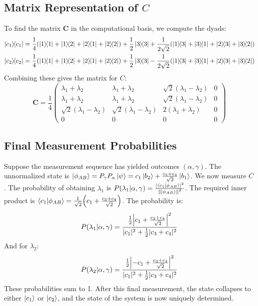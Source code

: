 \documentclass[11pt,a4paper]{article}
\begin{document}
\subsection{Matrix Representation of \texorpdfstring{$C$}{C}}
To find the matrix $\mathbf{C}$ in the computational basis, we compute the dyads:
\begin{align*}
  \dyad{c_1}{c_1} &=
  \frac{1}{4}\qty(\dyad{1}{1}+\dyad{1}{2}+\dyad{2}{1}+\dyad{2}{2}) +
  \frac{1}{2}\dyad{3}{3} +
  \frac{1}{2\sqrt{2}}\qty(\dyad{1}{3}+\dyad{3}{1}+\dyad{2}{3}+\dyad{3}{2}) \\
  \dyad{c_2}{c_2} &=
  \frac{1}{4}\qty(\dyad{1}{1}+\dyad{1}{2}+\dyad{2}{1}+\dyad{2}{2}) +
  \frac{1}{2}\dyad{3}{3} -
  \frac{1}{2\sqrt{2}}\qty(\dyad{1}{3}+\dyad{3}{1}+\dyad{2}{3}+\dyad{3}{2})
\end{align*}
Combining these gives the matrix for $C$:
$$
\mathbf{C} = \frac{1}{4}
\begin{pmatrix}
  \lambda_1+\lambda_2 & \lambda_1+\lambda_2 & \sqrt{2}(\lambda_1-\lambda_2) & 0
  \\
  \lambda_1+\lambda_2 & \lambda_1+\lambda_2 & \sqrt{2}(\lambda_1-\lambda_2) & 0
  \\
  \sqrt{2}(\lambda_1-\lambda_2) & \sqrt{2}(\lambda_1-\lambda_2) &
  2(\lambda_1+\lambda_2) & 0 \\
  0 & 0 & 0 & 0
\end{pmatrix}
$$

\subsection{Final Measurement Probabilities}
Suppose the measurement sequence has yielded outcomes $(\alpha, \gamma)$. The
unnormalized state is $\ket{\phi_{AB}} = P_\gamma P_\alpha \ket{\psi} =
c_1\ket{b_2} + \frac{c_3+c_4}{\sqrt{2}}\ket{b_1}$.
We now measure $C$. The probability of obtaining $\lambda_1$ is
$P(\lambda_1|\alpha, \gamma) =
\frac{|\braket{c_1}{\phi_{AB}}|^2}{\norm{\ket{\phi_{AB}}}^2}$.
The required inner product is $\braket{c_1}{\phi_{AB}} =
\frac{1}{\sqrt{2}}\qty(c_1 + \frac{c_3+c_4}{\sqrt{2}})$.
The probability is:
$$
P(\lambda_1|\alpha, \gamma) = \frac{\frac{1}{2}\abs{c_1 +
\frac{c_3+c_4}{\sqrt{2}}}^2}{|c_1|^2 + \frac{1}{2}|c_3+c_4|^2}
$$
And for $\lambda_2$:
$$
P(\lambda_2|\alpha, \gamma) = \frac{\frac{1}{2}\abs{-c_1 +
\frac{c_3+c_4}{\sqrt{2}}}^2}{|c_1|^2 + \frac{1}{2}|c_3+c_4|^2}
$$
These probabilities sum to 1. After this final measurement, the state collapses
to either $\ket{c_1}$ or $\ket{c_2}$, and the state of the system is now
uniquely determined.
\end{document}
